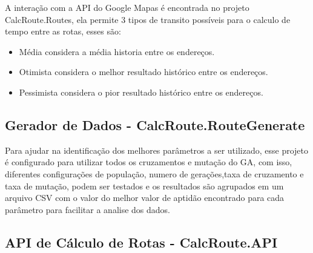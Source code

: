 A interação com a API do Google Mapas é encontrada no projeto CalcRoute.Routes, ela permite 3 tipos de transito possíveis para o calculo de tempo entre as rotas, esses são:
\begin{itemize}
	\item Média considera a média historia entre os endereços.
	\item Otimista considera o melhor resultado histórico entre os endereços.
	\item Pessimista considera o pior resultado histórico entre os endereços.
\end{itemize}

\subsection{Gerador de Dados - CalcRoute.RouteGenerate}

Para ajudar na identificação dos melhores parâmetros a ser utilizado, esse projeto é configurado para utilizar todos os cruzamentos e mutação do GA, com isso, diferentes configurações de população, numero de gerações,taxa de cruzamento e taxa de mutação, podem ser testados e os resultados são agrupados em um arquivo CSV com o valor do melhor valor de aptidão encontrado para cada parâmetro para facilitar a analise dos dados.

\begin{center}
	\label{fig:DataGenerate}
\end{center}

\subsection{API de Cálculo de Rotas - CalcRoute.API}

